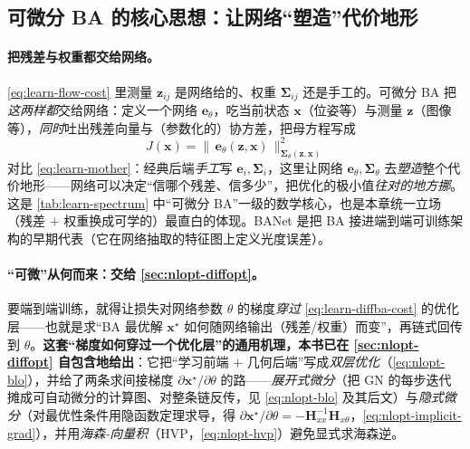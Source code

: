 \subsection{可微分 BA 的核心思想：让网络“塑造”代价地形}
\label{sec:learning-diffba-core}

\paragraph{把残差与权重都交给网络。}
\cref{eq:learn-flow-cost} 里测量 $\mathbf{z}_{ij}$ 是网络给的、权重 $\boldsymbol\Sigma_{ij}$ 还是手工的。可微分 BA 把\emph{这两样都}交给网络：定义一个网络 $\mathbf{e}_\theta$，吃当前状态 $\mathbf{x}$（位姿等）与测量 $\mathbf{z}$（图像等），\emph{同时}吐出残差向量与（参数化的）协方差，把母方程写成
\begin{equation}
  \boxed{\;J(\mathbf{x})=\big\|\,\mathbf{e}_\theta(\mathbf{z},\mathbf{x})\,\big\|_{\boldsymbol\Sigma_\theta(\mathbf{z},\mathbf{x})}^{2}\;}
  \label{eq:learn-diffba-cost}
\end{equation}
对比 \cref{eq:learn-mother}：经典后端\emph{手工}写 $\mathbf{e}_i,\boldsymbol\Sigma_i$，这里让网络 $\mathbf{e}_\theta,\boldsymbol\Sigma_\theta$ 去\emph{塑造}整个代价地形——网络可以决定“信哪个残差、信多少”，把优化的极小值\emph{往对的地方挪}。这是 \cref{tab:learn-spectrum} 中“可微分 BA”一级的数学核心，也是本章统一立场（残差 $+$ 权重换成可学的）最直白的体现。BANet\cite{tang2019banet} 是把 BA 接进端到端可训练架构的早期代表（它在网络抽取的特征图上定义光度误差）。

\paragraph{“可微”从何而来：交给 \cref{sec:nlopt-diffopt}。}
要端到端训练，就得让损失对网络参数 $\theta$ 的梯度\emph{穿过} \cref{eq:learn-diffba-cost} 的优化层——也就是求“BA 最优解 $\mathbf{x}^\star$ 如何随网络输出（残差/权重）而变”，再链式回传到 $\theta$。\textbf{这套“梯度如何穿过一个优化层”的通用机理，本书已在 \cref{sec:nlopt-diffopt} 自包含地给出}：它把“学习前端 $+$ 几何后端”写成\emph{双层优化}（\cref{eq:nlopt-blo}），并给了两条求间接梯度 $\partial\mathbf{x}^\star/\partial\theta$ 的路——\emph{展开式微分}（把 GN 的每步迭代摊成可自动微分的计算图、对整条链反传，见 \cref{eq:nlopt-blo} 及其后文）与\emph{隐式微分}（对最优性条件用隐函数定理求导，得 $\partial\mathbf{x}^\star/\partial\theta=-\mathbf{H}_{xx}^{-1}\mathbf{H}_{x\theta}$，\cref{eq:nlopt-implicit-grad}），并用\emph{海森-向量积}（HVP，\cref{eq:nlopt-hvp}）避免显式求海森逆。

